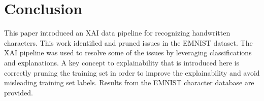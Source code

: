 \documentclass[conference]{IEEEtran}
\begin{document}
\section{Conclusion}






This paper introduced an XAI data pipeline for recognizing handwritten
characters. This work identified and pruned issues in the EMNIST dataset.  The
XAI pipeline was used to resolve some of the issues by leveraging
classifications and explanations.  A key concept to explainability that is
introduced here is correctly pruning the training set in order to improve the
explainability and avoid misleading training set labels. Results from the EMNIST
character database are provided.



\end{document}
